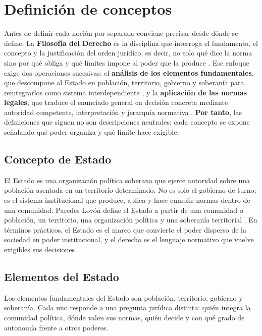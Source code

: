 \documentclass[
spanish,
letterpaper, oneside
]{article}
\begin{document}
	\section{Definición de conceptos}
	
	Antes de definir cada noción por separado conviene precisar desde dónde se define. La \textbf{Filosofía del Derecho} es la disciplina que interroga el fundamento, el concepto y la justificación del orden jurídico, es decir, no solo qué dice la norma sino por qué obliga y qué límites impone al poder que la produce \citep{kelsen1982,ansutegui2007}. Ese enfoque exige dos operaciones sucesivas: el \textbf{análisis de los elementos fundamentales}, que descompone al Estado en población, territorio, gobierno y soberanía para reintegrarlos como sistema interdependiente \citep{paredes2020}, y la \textbf{aplicación de las normas legales}, que traduce el enunciado general en decisión concreta mediante autoridad competente, interpretación y jerarquía normativa \citep{cpeum2026,garcia2002}. \textbf{Por tanto}, las definiciones que siguen no son descripciones neutrales: cada concepto se expone señalando qué poder organiza y qué límite hace exigible.
	
	\subsection{Concepto de Estado}
	
	El Estado es una organización política soberana que ejerce autoridad sobre una población asentada en un territorio determinado. No es solo el gobierno de turno; es el sistema institucional que produce, aplica y hace cumplir normas dentro de una comunidad. Paredes Lovón define el Estado a partir de una comunidad o población, un territorio, una organización política y una soberanía territorial \citep{paredes2020}. En términos prácticos, el Estado es el marco que convierte el poder disperso de la sociedad en poder institucional, y el derecho es el lenguaje normativo que vuelve exigibles sus decisiones \citep{garcia2002}.
	
	\subsection{Elementos del Estado}
	
	Los elementos fundamentales del Estado son población, territorio, gobierno y soberanía. Cada uno responde a una pregunta jurídica distinta: quién integra la comunidad política, dónde valen sus normas, quién decide y con qué grado de autonomía frente a otros poderes.
	
\end{document}
